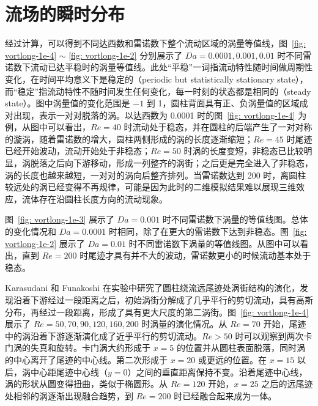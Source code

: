 \section{流场的瞬时分布}\label{sec: transient}

经过计算，可以得到不同达西数和雷诺数下整个流动区域的涡量等值线，图~\ref{fig: vortlong-1e-4} $\sim$ \ref{fig: vortlong-1e-2} 分别展示了 $Da=0.0001,0.001,0.01$ 时不同雷诺数下流动已达平稳时的涡量等值线。此处“平稳”一词指流动特性随时间做周期性变化，在时间平均意义下是稳定的（periodic but statistically stationary state），而“稳定”指流动特性不随时间发生任何变化，每一时刻的状态都是相同的（steady state）。图中涡量值的变化范围是 $-1$ 到 1，圆柱背面具有正、负涡量值的区域成对出现，表示一对对脱落的涡。以达西数为 0.0001 时的图~\ref{fig: vortlong-1e-4} 为例，从图中可以看出，$Re=40$ 时流动处于稳态，并在圆柱的后端产生了一对对称的漩涡，随着雷诺数的增大，圆柱两侧形成的涡的长度逐渐缩短；$Re=45$ 时尾迹已经开始波动，流动开始处于非稳态；$Re=50$ 时涡的长度变短，非稳态已比较明显，涡脱落之后向下游移动，形成一列整齐的涡街；之后更是完全进入了非稳态，涡的长度也越来越短，一对对的涡向后整齐排列。当雷诺数达到 200 时，离圆柱较远处的涡已经变得不再规律，可能是因为此时的二维模拟结果难以展现三维效应，流体存在沿圆柱长度方向的流动现象。

图~\ref{fig: vortlong-1e-3} 展示了 $Da=0.001$ 时不同雷诺数下涡量的等值线图。总体的变化情况和 $Da=0.0001$ 时相同，除了在更大的雷诺数下达到非稳态。图~\ref{fig: vortlong-1e-2} 展示了 $Da=0.01$ 时不同雷诺数下涡量的等值线图。从图中可以看出，直到 $Re=200$ 时尾迹才具有并不大的波动，雷诺数更小的时候流动基本处于稳态。

Karasudani 和 Funakoshi\cite{Karasudani1994} 在实验中研究了圆柱绕流远尾迹处涡街结构的演化，发现沿着下游经过一段距离之后，初始涡街分解成了几乎平行的剪切流动，具有高斯分布，再经过一段距离，形成了具有更大尺度的第二涡街。图~\ref{fig: vortlong-1e-4} 展示了 $Re=50,70,90,120,160,200$ 时涡量的演化情况。从 $Re=70$ 开始，尾迹中的涡沿着下游逐渐演化成了近乎平行的剪切流动。$Re>50$ 时可以观察到两次卡门涡的失真和旋转。卡门涡大约形成于 $x=5$ 的位置并从圆柱表面脱落，同时涡的中心离开了尾迹的中心线。第二次形成于 $x=20$ 或更远的位置。在 $x=15$ 以后，涡中心距尾迹中心线（$y=0$）之间的垂直距离保持不变。沿着尾迹中心线，涡的形状从圆变得扭曲，类似于椭圆形。从 $Re=120$ 开始，$x=25$ 之后的远尾迹处相邻的涡逐渐出现融合趋势，到 $Re=200$ 时已经融合起来成为一体。

